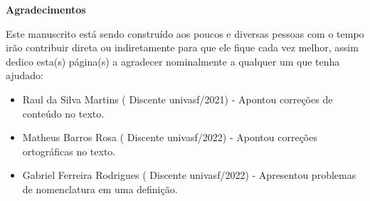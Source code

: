 \begingroup
\thispagestyle{empty}
\begin{center}
	{\normalfont\fontsize{20}{20}\sffamily\selectfont \textbf{Agradecimentos}}\par
\end{center}

\vspace{1cm}

Este manuscrito está sendo construído aos poucos e diversas pessoas com o tempo irão contribuir direta ou indiretamente para que ele fique cada vez melhor, assim dedico esta(s) página(s) a agradecer nominalmente a qualquer um que tenha ajudado:

\begin{itemize}
	\item {\color{red}Raul da Silva Martins} ({\color{blue} Discente univasf/2021}) - Apontou correções de conteúdo no texto.
	\item {\color{red}Matheus Barros Rosa} ({\color{blue} Discente univasf/2022}) - Apontou correções ortográficas no texto.
	\item {\color{red}Gabriel Ferreira Rodrigues} ({\color{blue} Discente univasf/2022}) - Apresentou problemas de nomenclatura em uma definição.
\end{itemize}

\endgroup
